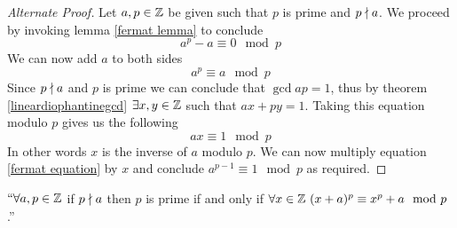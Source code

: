         \begin{proof}[Alternate Proof]
            Let $a, p \in \mathbb{Z}$ be given such that $p$ is prime and $p \nmid a$.
            We proceed by invoking lemma \ref{fermat lemma} to conclude
            \[
                a^p - a \equiv 0 \mod p
            \]
            We can now add $a$ to both sides
            \begin{equation}
                a^p \equiv a \mod p
                \label{fermat equation}
            \end{equation}
            Since $p \nmid a$ and $p$ is prime we can conclude that $\gcd{a}{p} = 1$,
            thus by theorem \ref{lineardiophantinegcd} $\exists x, y \in \mathbb{Z}$ such that
            $ax + py = 1$. Taking this equation modulo $p$ gives us the following
            \[
                ax \equiv 1 \mod p
            \]
            In other words $x$ is the inverse of $a$ modulo $p$. We can now multiply
            equation \ref{fermat equation} by $x$ and conclude $a^{p - 1} \equiv 1 \mod p$
            as required. \QED
        \end{proof}
        \begin{theorem}
            $``\forall a, p \in \mathbb{Z}$ if $p \nmid a$ then
            $p$ is prime if and only if $\forall x \in \mathbb{Z} \ (x + a)^p \equiv x^p + a \mod p$.''
        \end{theorem}

